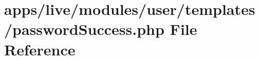 \hypertarget{live_2modules_2user_2templates_2password_success_8php}{\section{apps/live/modules/user/templates/password\-Success.php File Reference}
\label{live_2modules_2user_2templates_2password_success_8php}
}
